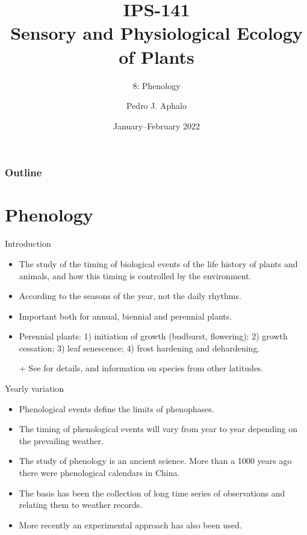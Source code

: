 \documentclass[10pt]{beamer}
\begin{document}
\title{IPS-141\\Sensory and Physiological Ecology of  Plants}
\subtitle{8: Phenology}
\author{Pedro J. Aphalo}
\date{January--February 2022}


  \begin{frame}
    \maketitle
  \end{frame}



  \begin{frame}
    \frametitle{Outline}
    \tableofcontents
  \end{frame}

\section{Phenology}

\begin{frame}{Introduction}
    \begin{itemize}
        \item The study of the timing of biological events of
        the life history of plants and animals, and how
        this timing is controlled by the environment.
        \item According to the seasons of the year, not the daily
        rhythms.
        \item Important both for annual, biennial and perennial
        plants.
        \item Perennial plants: 1) initiation of growth
        (budburst, flowering); 2) growth cessation; 3) leaf senescence; 4) frost hardening and
        dehardening.
        \item[+] See \autocite{Larcher2003} for details, and
        information on species from other latitudes.
    \end{itemize}
\end{frame}

\begin{frame}{Yearly variation}
    \begin{itemize}
        \item Phenological events define the limits of
        phenophases.%
        \item The timing of phenological events will vary from
        year to year depending on the prevailing weather.%
        \item The study of phenology is an ancient science. More
        than a 1000 years ago there were phenological calendars in
        China.%
        \item The basis has been the collection of long time
        series of observations and relating them to weather records.%
        \item More recently an experimental approach has also
        been used.%
    \end{itemize}
\end{frame}
\end{document}
